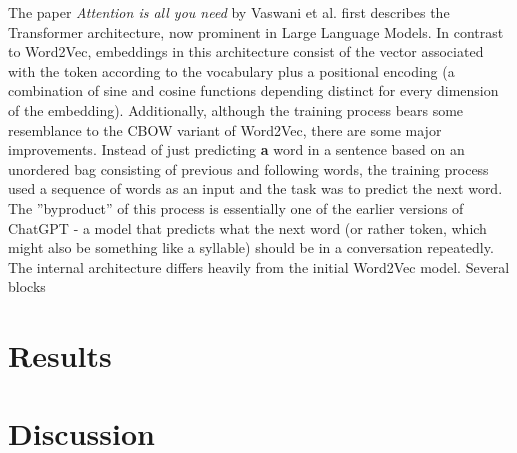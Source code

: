 \documentclass[draft,final]{vutinfth} %
\begin{document}
The paper \textit{Attention is all you need} \cite{vaswani_attention_2017} by Vaswani et al. first describes the Transformer architecture, now prominent in Large Language Models. In contrast to Word2Vec, embeddings in this architecture consist of the vector associated with the token according to the vocabulary plus a positional encoding (a combination of sine and cosine functions depending distinct for every dimension of the embedding). Additionally, although the training process bears some resemblance to the CBOW variant of Word2Vec, there are some major improvements. Instead of just predicting \textbf{a} word in a sentence based on an unordered bag consisting of previous and following words, the training process used a sequence of words as an input and the task was to predict the next word. The ''byproduct'' of this process is essentially one of the earlier versions of ChatGPT - a model that predicts what the next word (or rather token, which might also be something like a syllable) should be in a conversation repeatedly. The internal architecture differs heavily from the initial Word2Vec model. Several blocks


\chapter{Results}


\chapter{Discussion}


\backmatter

\begin{aitools}
\end{aitools}

\begin{kitools}
\end{kitools}

\listoffigures %

\cleardoublepage %
\listoftables %


\printindex

\printglossaries



\end{document}
